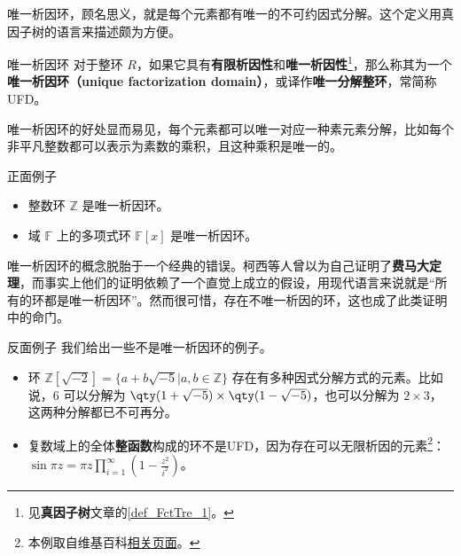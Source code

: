 


唯一析因环，顾名思义，就是每个元素都有唯一的不可约因式分解。这个定义用真因子树的语言来描述颇为方便。

\begin{definition}{唯一析因环}
对于整环 $R$，如果它具有\textbf{有限析因性}和\textbf{唯一析因性}\footnote{见\textbf{真因子树}文章的\autoref{def_FctTre_1}。}，那么称其为一个\textbf{唯一析因环（unique factorization domain）}，或译作\textbf{唯一分解整环}，常简称UFD。
\end{definition}


唯一析因环的好处显而易见，每个元素都可以唯一对应一种素元素分解，比如每个非平凡整数都可以表示为素数的乘积，且这种乘积是唯一的。

\begin{example}{正面例子}
\begin{itemize}
\item 整数环 $\mathbb{Z}$ 是唯一析因环。
\item 域 $\mathbb{F}$ 上的多项式环 $\mathbb{F}[x]$ 是唯一析因环。
\end{itemize}
\end{example}

唯一析因环的概念脱胎于一个经典的错误。柯西等人曾以为自己证明了\textbf{费马大定理}，而事实上他们的证明依赖了一个直觉上成立的假设，用现代语言来说就是“所有的环都是唯一析因环”。然而很可惜，存在不唯一析因的环，这也成了此类证明中的命门。

\begin{example}{反面例子}
我们给出一些不是唯一析因环的例子。
\begin{itemize}
\item 环 $\mathbb{Z}[\sqrt{-2}]=\{a+b\sqrt{-5}|a, b\in\mathbb{Z}\}$ 存在有多种因式分解方式的元素。比如说，$6$ 可以分解为 $\qty(1+\sqrt{-5})\times \qty(1-\sqrt{-5})$，也可以分解为 $2\times 3$，这两种分解都已不可再分。
\item 复数域上的全体\textbf{整函数}构成的环不是UFD，因为存在可以无限析因的元素\footnote{本例取自维基百科\href{https://en.wikipedia.org/wiki/Unique_factorization_domain}{相关页面}。}：$\sin{\pi z=\pi z\prod\limits_{i=1}^\infty(1-\frac{z^2}{i^2})}$。
\end{itemize}
\end{example}




